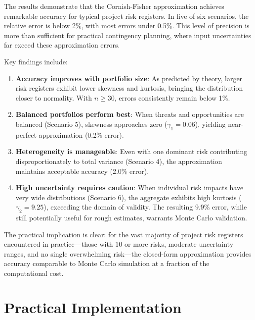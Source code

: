 \documentclass[12pt,a4paper]{article}
\theoremstyle{definition}
\theoremstyle{remark}
\begin{document}
The results demonstrate that the Cornish-Fisher approximation achieves remarkable accuracy for typical project risk registers. In five of six scenarios, the relative error is below 2\%, with most errors under 0.5\%. This level of precision is more than sufficient for practical contingency planning, where input uncertainties far exceed these approximation errors.

Key findings include:

\begin{enumerate}
    \item \textbf{Accuracy improves with portfolio size}: As predicted by theory, larger risk registers exhibit lower skewness and kurtosis, bringing the distribution closer to normality. With $n \geq 30$, errors consistently remain below 1\%.
    
    \item \textbf{Balanced portfolios perform best}: When threats and opportunities are balanced (Scenario 5), skewness approaches zero ($\gamma_1 = 0.06$), yielding near-perfect approximation (0.2\% error).

    \item \textbf{Heterogeneity is manageable}: Even with one dominant risk contributing disproportionately to total variance (Scenario 4), the approximation maintains acceptable accuracy (2.0\% error).

    \item \textbf{High uncertainty requires caution}: When individual risk impacts have very wide distributions (Scenario 6), the aggregate exhibits high kurtosis ($\gamma_2 = 9.25$), exceeding the domain of validity. The resulting 9.9\% error, while still potentially useful for rough estimates, warrants Monte Carlo validation.
\end{enumerate}

The practical implication is clear: for the vast majority of project risk registers encountered in practice—those with 10 or more risks, moderate uncertainty ranges, and no single overwhelming risk—the closed-form approximation provides accuracy comparable to Monte Carlo simulation at a fraction of the computational cost.

\section{Practical Implementation}
\label{sec:practical}
\end{document}
